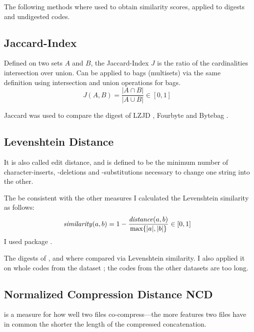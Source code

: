\documentclass[../main.tex]{subfiles}
\begin{document}
The following methods where used to obtain similarity scores, applied to digests and undigested codes.

\subsection{Jaccard-Index \label{sec:jacc}}

Defined on two sets $A$ and $B$, the Jaccard-Index $J$ is the ratio of the cardinalities intersection over union. Can be applied to bags (multisets) via the same definition using intersection and union operations for bags.
\begin{equation}
  J(A,B) = \dfrac{|A \cap B|}{|A \cup B|} \in [0,1]
  \label{eq:jaccard}
\end{equation}

Jaccard was used to compare the digest of LZJD , Fourbyte  and Bytebag .

\subsection{Levenshtein Distance \label{sec:lev}}

It is also called edit distance, and is defined to be the minimum number of character-inserts, -deletions and -substitutions necessary to change one string into the other.

The be consistent with the other measures I calculated the Levenshtein similarity as follows:
\begin{equation}
  \mbox{\textit{similarity}}(a, b) = 1 - \dfrac{\mbox{\textit{distance}}(a, b)}{\max\{|a|, |b|\}} \in [0,1]
  \label{eq:levSim}
\end{equation}
I used  package \cite{pyLev}.

The digests of  ,   and   where compared via Levenshtein similarity. I also applied it on whole codes from the  dataset ; the codes from the other datasets are too long.

\subsection{Normalized Compression Distance NCD \label{sec:ncd}}

 is a measure for how well two files co-compress---the more features two files have in common the shorter the length of the compressed concatenation.
\end{document}
